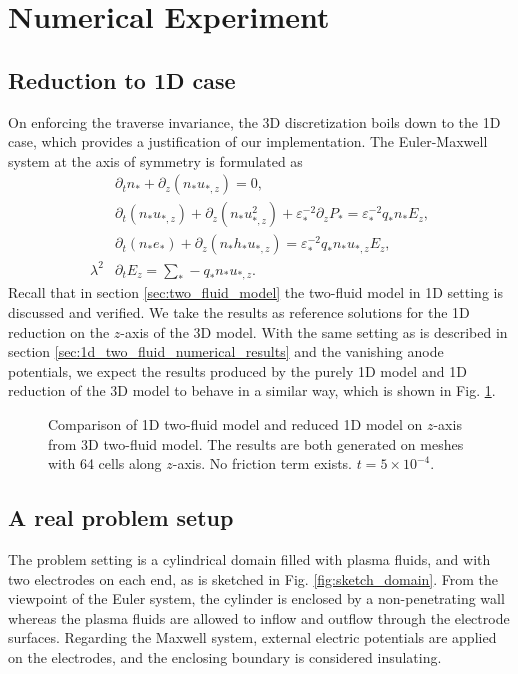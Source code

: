 \documentclass{article}
\newcommand{\todo}[1]{\textcolor{blue}{\fbox{\textbf{TODO: #1}}}}
\begin{document}
\section{Numerical Experiment}

\subsection{Reduction to 1D case}
On enforcing the traverse invariance, the 3D discretization boils down to the 1D case, which provides a justification of our implementation.
The Euler-Maxwell system at the axis of symmetry is formulated as 
\begin{align}
    &\partial_t n_* + \partial_z(n_*u_{*,z}) = 0, \\
    &\partial_t (n_* u_{*,z}) + \partial_z(n_*u_{*,z}^2) + \varepsilon_*^{-2} \partial_z P_* = \varepsilon_*^{-2}q_*n_*E_z, \\
    &\partial_t (n_*e_*) + \partial_z (n_* h_* u_{*,z}) = \varepsilon_*^{-2} q_* n_* u_{*,z} E_z, \\
    \lambda^2 &\partial_t E_z = \sum_* - q_* n_* u_{*,z}.
\end{align}
Recall that in section \ref{sec:two_fluid_model} the two-fluid model in 1D setting is discussed and verified. We take the results as reference solutions for the 1D reduction on the $z$-axis of the 3D model. With the same setting as is described in section \ref{sec:1d_two_fluid_numerical_results} and the vanishing anode potentials, we expect the results produced by the purely 1D model and 1D reduction of the 3D model to behave in a similar way, which is shown in Fig. \ref{fig:z_axis_reduction}.
\begin{figure}
    \centering
    \caption{Comparison of 1D two-fluid model and reduced 1D model on $z$-axis from 3D two-fluid model. The results are both generated on meshes with 64 cells along $z$-axis. No friction term exists. $t = 5 \times 10^{-4}.$}
    \label{fig:z_axis_reduction}
\end{figure}

\todo{Do more thorough tests}

\subsection{A real problem setup}
The problem setting is a cylindrical domain filled with plasma fluids, and with two electrodes on each end, as is sketched in Fig. \ref{fig:sketch_domain}. From the viewpoint of the Euler system, the cylinder is enclosed by a non-penetrating wall whereas the plasma fluids are allowed to inflow and outflow through the electrode surfaces. Regarding the Maxwell system, external electric potentials are applied on the electrodes, and the enclosing boundary is considered insulating. 
\end{document}
